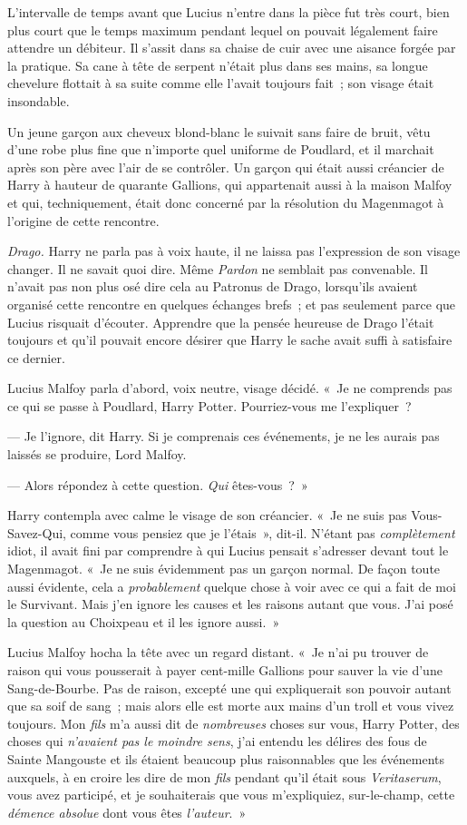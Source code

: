 L'intervalle de temps avant que Lucius n'entre dans la pièce fut très court, bien plus court que le temps maximum pendant lequel on pouvait légalement faire attendre un débiteur.
Il s'assit dans sa chaise de cuir avec une aisance forgée par la pratique.
Sa cane à tête de serpent n'était plus dans ses mains, sa longue chevelure flottait à sa suite comme elle l'avait toujours fait~; son visage était insondable.

Un jeune garçon aux cheveux blond-blanc le suivait sans faire de bruit, vêtu d'une robe plus fine que n'importe quel uniforme de Poudlard, et il marchait après son père avec l'air de se contrôler.
Un garçon qui était aussi créancier de Harry à hauteur de quarante Gallions, qui appartenait aussi à la maison Malfoy et qui, techniquement, était donc concerné par la résolution du Magenmagot à l'origine de cette rencontre.

\emph{Drago.} Harry ne parla pas à voix haute, il ne laissa pas l'expression de son visage changer.
Il ne savait quoi dire.
Même \emph{Pardon} ne semblait pas convenable.
Il n'avait pas non plus osé dire cela au Patronus de Drago, lorsqu'ils avaient organisé cette rencontre en quelques échanges brefs~; et pas seulement parce que Lucius risquait d'écouter.
Apprendre que la pensée heureuse de Drago l'était toujours et qu'il pouvait encore désirer que Harry le sache avait suffi à satisfaire ce dernier.

Lucius Malfoy parla d'abord, voix neutre, visage décidé.
«~Je ne comprends pas ce qui se passe à Poudlard, Harry Potter.
Pourriez-vous me l'expliquer~?

--- Je l'ignore, dit Harry.
Si je comprenais ces événements, je ne les aurais pas laissés se produire, Lord Malfoy.

--- Alors répondez à cette question.
\emph{Qui} êtes-vous~?~»

Harry contempla avec calme le visage de son créancier.
«~Je ne suis pas Vous-Savez-Qui, comme vous pensiez que je l'étais~», dit-il.
N'étant pas \emph{complètement} idiot, il avait fini par comprendre à qui Lucius pensait s'adresser devant tout le Magenmagot.
«~Je ne suis évidemment pas un garçon normal.
De façon toute aussi évidente, cela a \emph{probablement} quelque chose à voir avec ce qui a fait de moi le Survivant.
Mais j'en ignore les causes et les raisons autant que vous.
J'ai posé la question au Choixpeau et il les ignore aussi.~»

Lucius Malfoy hocha la tête avec un regard distant.
«~Je n'ai pu trouver de raison qui vous pousserait à payer cent-mille Gallions pour sauver la vie d'une Sang-de-Bourbe.
Pas de raison, excepté une qui expliquerait son pouvoir autant que sa soif de sang~; mais alors elle est morte aux mains d'un troll et vous vivez toujours.
Mon \emph{fils} m'a aussi dit de \emph{nombreuses} choses sur vous, Harry Potter, des choses qui \emph{n'avaient pas le moindre sens}, j'ai entendu les délires des fous de Sainte Mangouste et ils étaient beaucoup plus raisonnables que les événements auxquels, à en croire les dire de mon \emph{fils} pendant qu'il était sous \emph{Veritaserum}, vous avez participé, et je souhaiterais que vous m'expliquiez, sur-le-champ, cette \emph{démence absolue} dont vous êtes \emph{l'auteur}.~»

